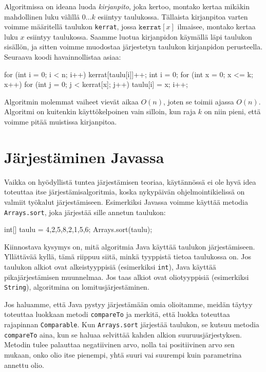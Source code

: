 Algoritmissa on ideana luoda \emph{kirjanpito}, joka kertoo,
montako kertaa mikäkin mahdollinen luku välillä $0 \dots k$
esiintyy taulukossa.
Tällaista kirjanpitoa varten voimme määritellä taulukon
\texttt{kerrat}, jossa $\texttt{kerrat}[x]$ ilmaisee,
montako kertaa luku $x$ esiintyy taulukossa.
Saamme luotua kirjanpidon käymällä läpi taulukon sisällön,
ja sitten voimme muodostaa järjestetyn taulukon
kirjanpidon perusteella.
Seuraava koodi havainnollistaa asiaa:

\begin{code}
for (int i = 0; i < n; i++) {
    kerrat[taulu[i]]++;
}
int i = 0;
for (int x = 0; x <= k; x++) {
    for (int j = 0; j < kerrat[x]; j++) {
        taulu[i] = x;
        i++;
    }
}
\end{code}

Algoritmin molemmat vaiheet vievät aikaa $O(n)$,
joten se toimii ajassa $O(n)$.
Algoritmi on kuitenkin käyttökelpoinen vain silloin,
kun raja $k$ on niin pieni, että voimme pitää
muistissa kirjanpitoa.

\section{Järjestäminen Javassa}

Vaikka on hyödyllistä tuntea järjestämisen teoriaa,
käytännössä ei ole hyvä idea toteuttaa itse
järjestämisalgoritmia, koska nykypäivän ohjelmointikielissä
on valmiit työkalut järjestämiseen.
Esimerkiksi Javassa voimme käyttää metodia \texttt{Arrays.sort},
joka järjestää sille annetun taulukon:

\begin{code}
int[] taulu = {4,2,5,8,2,1,5,6};
Arrays.sort(taulu);
\end{code}

Kiinnostava kysymys on, mitä algoritmia Java käyttää
taulukon järjes\-tämiseen.
Yllättävää kyllä, tämä riippuu siitä, minkä tyyppistä tietoa
taulukossa on.
Jos taulukon alkiot ovat alkeistyyppisiä
(esimerkiksi \texttt{int}), Java käyttää 
pikajärjestämisen muunnelmaa.
Jos taas alkiot ovat oliotyyppisiä
(esimerkiksi \texttt{String}),
algoritmina on lomitusjärjestäminen.

Jos haluamme, että Java pystyy järjestämään omia olioitamme,
meidän täytyy toteuttaa luokkaan metodi \texttt{compareTo} ja
merkitä, että luokka toteuttaa rajapinnan \texttt{Comparable}.
Kun \texttt{Arrays.sort} järjestää taulukon,
se kutsuu metodia \texttt{compareTo} aina, kun se haluaa selvittää
kahden alkion suuruusjärjestyksen.
Metodin tulee palauttaa negatiivinen arvo, nolla tai positiivinen arvo
sen mukaan, onko olio itse pienempi, yhtä suuri vai suurempi
kuin parametrina annettu olio.


